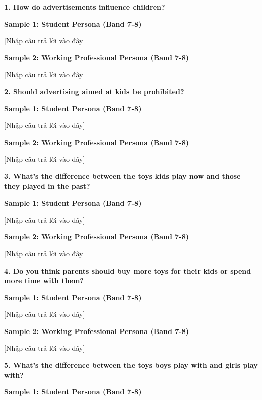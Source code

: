 \partthreeheader

\begin{ieltsquestion}
\textbf{1. How do advertisements influence children?}
\end{ieltsquestion}
\textbf{Sample 1: Student Persona (Band 7-8)}

[Nhập câu trả lời vào đây]

\textbf{Sample 2: Working Professional Persona (Band 7-8)}

[Nhập câu trả lời vào đây]

\separator

\begin{ieltsquestion}
\textbf{2. Should advertising aimed at kids be prohibited?}
\end{ieltsquestion}
\textbf{Sample 1: Student Persona (Band 7-8)}

[Nhập câu trả lời vào đây]

\textbf{Sample 2: Working Professional Persona (Band 7-8)}

[Nhập câu trả lời vào đây]

\separator

\begin{ieltsquestion}
\textbf{3. What's the difference between the toys kids play now and those they played in the past?}
\end{ieltsquestion}
\textbf{Sample 1: Student Persona (Band 7-8)}

[Nhập câu trả lời vào đây]

\textbf{Sample 2: Working Professional Persona (Band 7-8)}

[Nhập câu trả lời vào đây]

\separator

\begin{ieltsquestion}
\textbf{4. Do you think parents should buy more toys for their kids or spend more time with them?}
\end{ieltsquestion}
\textbf{Sample 1: Student Persona (Band 7-8)}

[Nhập câu trả lời vào đây]

\textbf{Sample 2: Working Professional Persona (Band 7-8)}

[Nhập câu trả lời vào đây]

\separator

\begin{ieltsquestion}
\textbf{5. What's the difference between the toys boys play with and girls play with?}
\end{ieltsquestion}
\textbf{Sample 1: Student Persona (Band 7-8)}


